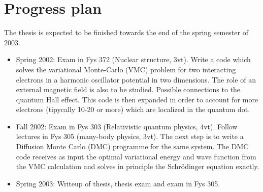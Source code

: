 \section*{Progress plan}
The thesis is expected to be finished towards the end  of the spring
semester of 2003.
\begin{itemize}
\item Spring 2002: Exam in Fys 372 (Nuclear structure, 3vt).
      Write a code which solves the variational Monte-Carlo (VMC) problem
      for two interacting electrons in a harmonic oscillator potential
      in two dimensions. The role of an external magnetic field 
      is also to be studied. Possible connections to the quantum Hall
      effect.
      This code is then expanded in order to account for more electrons
      (tipycally 10-20 or more) which are localized in the quantum dot.  
\item Fall 2002:  Exam in Fys 303 (Relativistic quantum physics, 4vt).
                  Follow lectures in Fys 305 (many-body physics, 3vt).
      The next step is to write a Diffusion Monte Carlo (DMC) programme 
      for the 
      same system. 
     The DMC code receives as input the optimal 
     variational energy and wave function from the VMC calculation and solves
     in principle the Schr\"odinger equation exactly.
\item Spring 2003: Writeup of thesis, thesis exam and exam in Fys 305.

\end{itemize}


